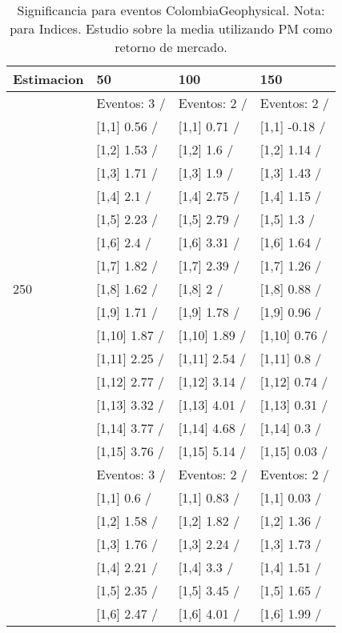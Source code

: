 \begin{table}

\caption{Significancia para eventos ColombiaGeophysical. Nota: para Indices. Estudio sobre la media utilizando PM como retorno de mercado.}
\centering
\begin{tabular}[t]{llll}
\toprule
Estimacion & 50 & 100 & 150\\
\midrule
 & Eventos:  3 / & Eventos:  2 / & Eventos:  2 /\\
 & {}[1,1] 0.56  / & {}[1,1] 0.71  / & {}[1,1] -0.18  /\\
 & {}[1,2] 1.53  / & {}[1,2] 1.6  / & {}[1,2] 1.14  /\\
 & {}[1,3] 1.71  / & {}[1,3] 1.9  / & {}[1,3] 1.43  /\\
 & {}[1,4] 2.1  / & {}[1,4] 2.75  / & {}[1,4] 1.15  /\\
\addlinespace
 & {}[1,5] 2.23  / & {}[1,5] 2.79  / & {}[1,5] 1.3  /\\
 & {}[1,6] 2.4  / & {}[1,6] 3.31  / & {}[1,6] 1.64  /\\
 & {}[1,7] 1.82  / & {}[1,7] 2.39  / & {}[1,7] 1.26  /\\
250 & {}[1,8] 1.62  / & {}[1,8] 2  / & {}[1,8] 0.88  /\\
 & {}[1,9] 1.71  / & {}[1,9] 1.78  / & {}[1,9] 0.96  /\\
\addlinespace
 & {}[1,10] 1.87  / & {}[1,10] 1.89  / & {}[1,10] 0.76  /\\
 & {}[1,11] 2.25  / & {}[1,11] 2.54  / & {}[1,11] 0.8  /\\
 & {}[1,12] 2.77  / & {}[1,12] 3.14  / & {}[1,12] 0.74  /\\
 & {}[1,13] 3.32  / & {}[1,13] 4.01  / & {}[1,13] 0.31  /\\
 & {}[1,14] 3.77  / & {}[1,14] 4.68  / & {}[1,14] 0.3  /\\
\addlinespace
 & {}[1,15] 3.76  / & {}[1,15] 5.14  / & {}[1,15] 0.03  /\\
 & Eventos:  3 / & Eventos:  2 / & Eventos:  2 /\\
 & {}[1,1] 0.6  / & {}[1,1] 0.83  / & {}[1,1] 0.03  /\\
 & {}[1,2] 1.58  / & {}[1,2] 1.82  / & {}[1,2] 1.36  /\\
 & {}[1,3] 1.76  / & {}[1,3] 2.24  / & {}[1,3] 1.73  /\\
\addlinespace
 & {}[1,4] 2.21  / & {}[1,4] 3.3  / & {}[1,4] 1.51  /\\
 & {}[1,5] 2.35  / & {}[1,5] 3.45  / & {}[1,5] 1.65  /\\
 & {}[1,6] 2.47  / & {}[1,6] 4.01  / & {}[1,6] 1.99  /\\

\end{tabular}
\end{table}
